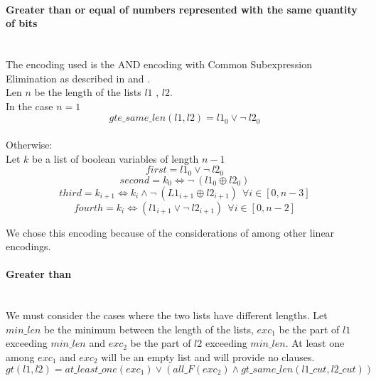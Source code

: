   \paragraph*{Greater than or equal of numbers represented with the same quantity of bits} \hfill \\
    The encoding used is the AND encoding with Common Subexpression Elimination as described in 
    \cite{Elgabou} and \cite{Zhao}.\\
    Len \(n\)  be the length of the lists \(l1\) , \(l2\).\\
    In the case \(n = 1\) 
    \begin{equation*}
      gte\_same\_len(l1, l2) = l1_0 \lor \neg \ l2_0
    \end{equation*}\\

    Otherwise:\\
    Let \(k\)  be a list of boolean variables of length \(n-1\) 
    \begin{equation*}
      first = l1_0 \lor \neg \ l2_0
    \end{equation*}
    \begin{equation*}
      second = k_0 \Longleftrightarrow \neg \ (l1_0 \oplus l2_0)
    \end{equation*}
    \begin{equation*}
      third = k_{i+1} \Longleftrightarrow k_i \land \neg \ (L1_{i+1} \oplus l2_{i+1}) \ \ \forall i \in [0, n-3]
    \end{equation*}
    \begin{equation*}
      fourth = k_i \Longleftrightarrow (l1_{i+1} \lor \neg \ l2_{i+1}) \ \ \forall i \in [0, n-2]
    \end{equation*}

    We chose this encoding because of the considerations of \cite{Zhao} among other linear encodings.

  \paragraph*{Greater than}  \hfill \\
    We must consider the cases where the two lists have different lengths.
    Let \(min\_len\)  be the minimum between the length of the lists, \(exc_1\)  be the part of \(l1\)  
    exceeding \(min\_len\)  and \(exc_2\)  
    be the part of \(l2\)  exceeding \(min\_len\). At least one among \(exc_1\)  and \(exc_2\)  will be an
    empty list and will provide no clauses.\\
    \begin{equation*}
      gt(l1, l2) = at\_least\_one(exc_1) \lor ( all\_F(exc_2) \land gt\_same\_len(l1\_cut, l2\_cut))
    \end{equation*}

